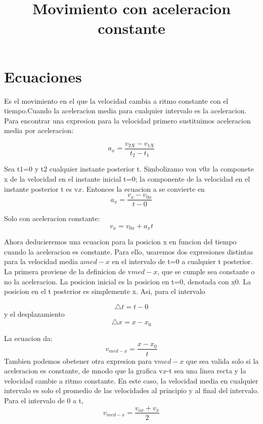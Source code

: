 \documentclass{article}
\title{Movimiento con aceleracion constante }%
\begin{document}
\maketitle


\section{Ecuaciones}
Es el movimiento en el que la velocidad cambia a ritmo constante con el tiempo.Cuando la aceleracion media para cualquier intervalo es la aceleracion.
Para encontrar una expresion para la velocidad primero sustituimos aceleracion media por aceleracion:

\begin{equation}
 a_{x}= \frac {v_{2X} - v_{1X}}{ t_{2} - t_{1}}
\end{equation}

Sea t$1$=0 y t$2$ cualquier instante posterior t. Simbolizamo von v$0x$ la componete x de la velocidad en el instante inicial t=0; la componente de la velocidad en el instante posterior t es v$x$. Entonces la ecuacion a se convierte en
\begin{equation}
 a_{x}= \frac {v_{x}-v_{0x}}{t-0}
\end{equation}

Solo con aceleracion constante:
\begin{equation}
 v_{x}= v_{0x} + a_{x}t
\end{equation}

Ahora deducieremos una ecuacion para la posicion x en funcion del tiempo cuando la aceleracion es constante. Para ello, usaremos
dos expresiones distintas para la velocidad media a$med-x$ en el intervalo de t=0 a cualquier t posterior. \\
La primera proviene de la definicion de v$med-x$, que se cumple sea constante o no la aceleracion. La posicion inicial es la posicion en t=0, denotada
con x$0$. La posicion en el t posterior es simplemente x. Asi, para el intervalo 

\begin{equation}
 \bigtriangleup{t} = t-0
\end{equation}
y el desplazamiento
\begin{equation}
 \bigtriangleup{x}= x- x_{0}
\end{equation}

La ecuacion da:
\begin{equation}
 v_{med-x} =\frac {x-x_{0}}{t}
\end{equation}
Tambien podemos obetener otra expresion para v$med-x$ que sea valida solo si la aceleracion es constante, de mnodo que la grafica v$x$-t sea una linea recta
y la velocidad cambie a ritmo constante. En este caso, la velocidad media en cualquier intervalo es solo el promedio de las velocidades al principio y al final del intervalo. 
Para el intervalo de 0 a t,
\begin{equation}
 v_{med-x} =\frac {v_{ox}+v_{x}}{2}
\end{equation}
\end{document}

